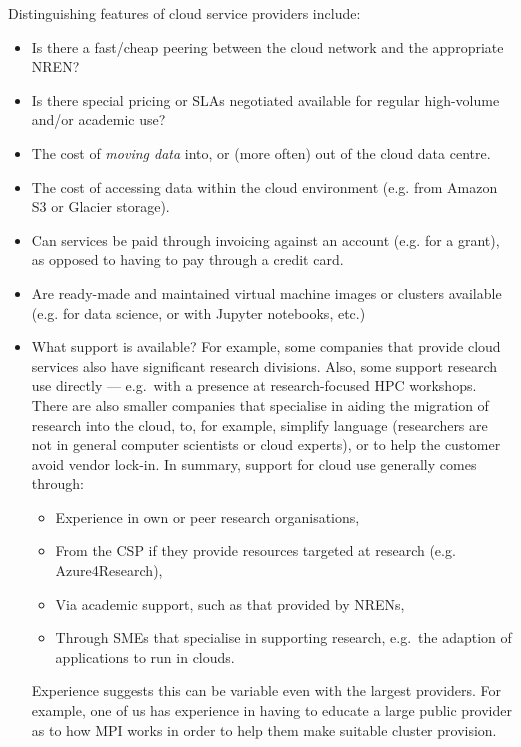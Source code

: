 \documentclass{../../template/esiwace-report}
\begin{document}
Distinguishing features of cloud service providers include:

\begin{itemize}
\item Is there a fast/cheap peering between the cloud network and the appropriate NREN?
\item Is there special pricing or SLAs negotiated available for regular high-volume and/or academic use?
\item The cost of \emph{moving data} into, or (more often) out of the cloud data centre.
\item The cost of accessing data within the cloud environment (e.g. from Amazon S3 or Glacier storage).
\item Can services be paid through invoicing against an account (e.g. for a grant), as opposed to having to pay through a credit card.
\item Are ready-made and maintained virtual machine images or clusters available (e.g. for data science, or with Jupyter notebooks, etc.)
\item What support is available? For example, some companies that provide cloud services also have significant research divisions.  Also, some support research use directly --- e.g.\ with a presence at research-focused HPC workshops.  There are also smaller companies that specialise in aiding the migration of research into the cloud, to, for example, simplify language (researchers are not in general computer scientists or cloud experts), or to help the customer avoid vendor lock-in.  In summary, support for cloud use generally comes through:
  \begin{itemize}
  \item Experience in own or peer research organisations,
  \item From the CSP if they provide resources targeted at research (e.g. Azure4Research),
  \item Via academic support, such as that provided by NRENs,
  \item Through SMEs that specialise in supporting research, e.g.\ the adaption of applications to run in clouds.
  \end{itemize} Experience suggests this can be variable even with the largest providers. For example, one of us has experience in having to educate a large public provider as to how MPI works in order to help them make suitable cluster provision.
\end{itemize}

\end{document}

